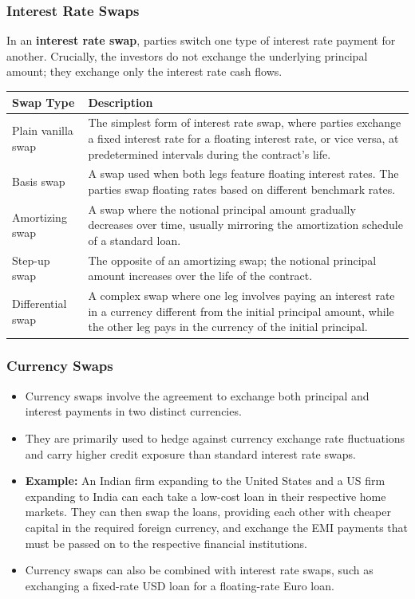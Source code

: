\documentclass[12pt,openany]{book}
\begin{document}
\subsubsection{Interest Rate Swaps}
In an \textbf{interest rate swap}, parties switch one type of interest rate payment for another. Crucially, the investors do not exchange the underlying principal amount; they exchange only the interest rate cash flows.

\begin{center}
\small
\begin{tabular}{|L{0.28\textwidth}|L{0.58\textwidth}|}
\hline
\textbf{Swap Type} & \textbf{Description} \\ \hline
Plain vanilla swap & The simplest form of interest rate swap, where parties exchange a fixed interest rate for a floating interest rate, or vice versa, at predetermined intervals during the contract's life. \\ \hline
Basis swap & A swap used when both legs feature floating interest rates. The parties swap floating rates based on different benchmark rates. \\ \hline
Amortizing swap & A swap where the notional principal amount gradually decreases over time, usually mirroring the amortization schedule of a standard loan. \\ \hline
Step-up swap & The opposite of an amortizing swap; the notional principal amount increases over the life of the contract. \\ \hline
Differential swap & A complex swap where one leg involves paying an interest rate in a currency different from the initial principal amount, while the other leg pays in the currency of the initial principal. \\ \hline
\end{tabular}
\end{center}

\subsubsection{Currency Swaps}

\begin{itemize}[leftmargin=*]
    \item Currency swaps involve the agreement to exchange both principal and interest payments in two distinct currencies.
    \item They are primarily used to hedge against currency exchange rate fluctuations and carry higher credit exposure than standard interest rate swaps.
    \item \textbf{Example:} An Indian firm expanding to the United States and a US firm expanding to India can each take a low-cost loan in their respective home markets. They can then swap the loans, providing each other with cheaper capital in the required foreign currency, and exchange the EMI payments that must be passed on to the respective financial institutions.
    \item Currency swaps can also be combined with interest rate swaps, such as exchanging a fixed-rate USD loan for a floating-rate Euro loan.
\end{itemize}
\end{document}
